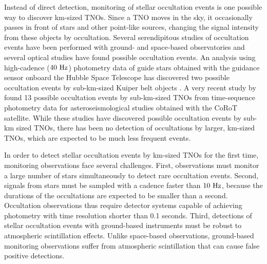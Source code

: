 \documentclass{pasj01}
\begin{document}
Instead of direct detection, 
monitoring of stellar occultation events 
is one possible way to discover km-sized TNOs. 
Since a TNO moves in the sky, 
it occasionally passes in front of stars and other point-like sources, 
changing the signal intensity from these objects by occultation.
Several serendipitous studies of occultation events 
have been performed with ground- and space-based observatories
and several optical studies have found possible occultation events.
An analysis using high-cadence ($40 \ {\rm Hz}$) photometry data of guide stars obtained 
with the guidance sensor 
onboard the Hubble Space Telescope has discovered two possible
occultation events by sub-km-sized Kuiper belt objects \citep{schlichting09,schlichting13}. 
A very recent study by \citet{liu15} found 13 possible occultation events by sub-km-sized TNOs
from time-sequence photometry data for asteroseismological studies obtained with the CoRoT satellite.
While these studies have discovered possible occultation events by sub-km sized TNOs,
there has been no detection of occultations by larger, km-sized TNOs, 
which are expected to be much less frequent events. 

In order to detect stellar occultation events by km-sized TNOs for the first time,
monitoring observations face several challenges.
First, observations must monitor a large number of stars simultaneously 
to detect rare occultation events.
Second, signals from stars must be sampled with a cadence faster than $10 \ {\rm Hz}$, 
because the durations of the occultations are expected to be smaller than a second.
Occultation observations thus require detector systems 
capable of achieving photometry with time resolution shorter than 0.1 seconds.
%
Third, detections of stellar occultation events with ground-based instruments 
must be robust to atmospheric scintillation effects.
Unlike space-based observations, 
ground-based monitoring observations suffer from
atmospheric scintillation that can cause false positive detections.
\end{document}
